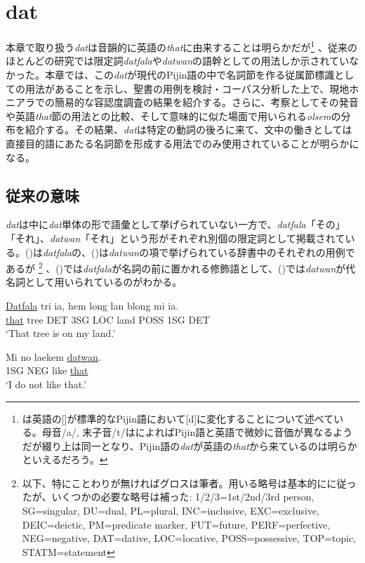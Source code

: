 \chapter{dat}

本章で取り扱う\textit{dat}は音韻的に英語の\textit{that}に由来することは明らかだが\footnote{
\cite{phonology}は英語の[]が標準的なPijin語において[d]に変化することについて述べている。母音/a/, 末子音/t/は\cite{phonology}によればPijin語と英語で微妙に音価が異なるようだが綴り上は同一となり、Pijin語の\textit{dat}が英語の\textit{that}から来ているのは明らかといえるだろう。
}
、従来のほとんどの研究では限定詞\textit{datfala}や\textit{datwan}の語幹としての用法しか示されていなかった。本章では、この\textit{dat}が現代のPijin語の中で名詞節を作る従属節標識としての用法があることを示し、聖書の用例を検討・コーパス分析した上で、現地ホニアラでの簡易的な容認度調査の結果を紹介する。さらに、考察としてその発音や英語\textit{that}節の用法との比較、そして意味的に似た場面で用いられる\textit{olsem}の分布を紹介する。その結果、\textit{dat}は特定の動詞の後ろに来て、文中の働きとしては直接目的語にあたる名詞節を形成する用法でのみ使用されていることが明らかになる。

\section{従来の意味}

\textit{dat}は\cite{dictionary}中に\textit{dat}単体の形で語彙として挙げられていない一方で、\textit{datfala}「その」「それ」、\textit{datwan}「それ」という形がそれぞれ別個の限定詞として掲載されている。()は\textit{datfala}の、()は\textit{datwan}の項で挙げられている辞書中のそれぞれの用例であるが
\footnote{
以下、特にことわりが無ければグロスは筆者。用いる略号は基本的に\cite{prepositions}に従ったが、いくつかの必要な略号は補った: 1/2/3=1st/2nd/3rd person, SG=singular, DU=dual, PL=plural, INC=inclusive, EXC=exclusive, DEIC=deictic, PM=predicate marker, FUT=future, PERF=perfective, NEG=negative, DAT=dative, LOC=locative, POSS=possessive, TOP=topic, STATM=statement}
、()では\textit{datfala}が名詞の前に置かれる修飾語として、()では\textit{datwan}が代名詞として用いられているのがわかる。

\begin{exe}
  \ex
  \gll \underline{Datfala} tri ia, hem long lan blong mi ia.\\
  \underline{that} tree DET 3SG LOC land POSS 1SG DET\\
  \glt `That tree is on my land.' \cite[34]{dictionary}

  \ex
  \gll Mi no laekem \underline{datwan}.\\
  1SG NEG like \underline{that}\\
  \glt `I do not like that.' \cite[34]{dictionary}
\end{exe}

